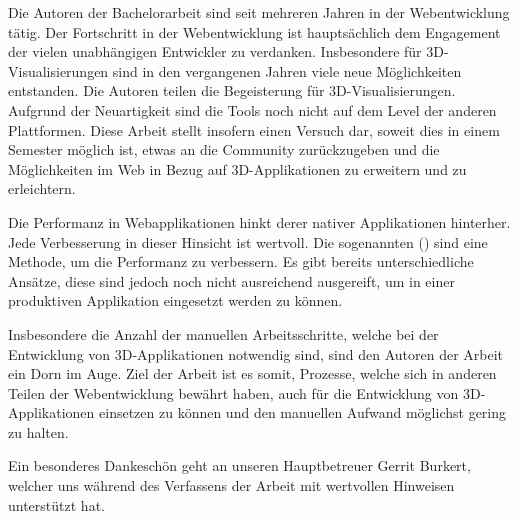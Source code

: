 
Die Autoren der Bachelorarbeit sind seit mehreren Jahren in der Webentwicklung tätig. Der Fortschritt in der Webentwicklung ist hauptsächlich dem Engagement der vielen unabhängigen Entwickler zu verdanken.
Insbesondere für 3D-Visualisierungen sind in den vergangenen Jahren viele neue Möglichkeiten entstanden. Die Autoren teilen die Begeisterung für 3D-Visualisierungen. Aufgrund der Neuartigkeit sind die Tools noch nicht auf dem Level der anderen Plattformen. Diese Arbeit stellt insofern einen Versuch dar, soweit dies in einem Semester möglich ist, etwas an die Community zurückzugeben und die Möglichkeiten im Web in Bezug auf 3D-Applikationen zu erweitern und zu erleichtern.

Die Performanz in Webapplikationen hinkt derer nativer Applikationen hinterher. Jede Verbesserung in dieser Hinsicht ist wertvoll. Die sogenannten  () sind eine Methode, um die Performanz zu verbessern. Es gibt bereits unterschiedliche Ansätze, diese sind jedoch noch nicht ausreichend ausgereift, um in einer produktiven Applikation eingesetzt werden zu können.

Insbesondere die Anzahl der manuellen Arbeitsschritte, welche bei der Entwicklung von 3D-Applikationen notwendig sind, sind den Autoren der Arbeit ein Dorn im Auge. Ziel der Arbeit ist es somit, Prozesse, welche sich in anderen Teilen der Webentwicklung bewährt haben, auch für die Entwicklung von 3D-Applikationen einsetzen zu können und den manuellen Aufwand möglichst gering zu halten.

Ein besonderes Dankeschön geht an unseren Hauptbetreuer Gerrit Burkert, welcher uns während des Verfassens der Arbeit mit wertvollen Hinweisen unterstützt hat.